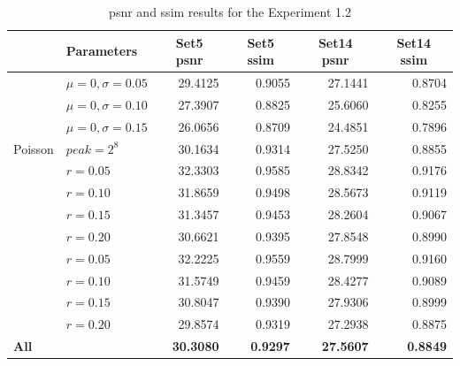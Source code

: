\begin{table}[]
	\centering
	\begin{tabular}{|l|l|r|r|r|r|}
		\hline
		\rowcolor[HTML]{EFEFEF} 
		\multicolumn{1}{|c|}{\cellcolor[HTML]{EFEFEF}\textbf{Noise}} & \textbf{Parameters} & \multicolumn{1}{c|}{\cellcolor[HTML]{EFEFEF}\textbf{Set5 \gls{psnr}}} & \multicolumn{1}{c|}{\cellcolor[HTML]{EFEFEF}\textbf{Set5 \gls{ssim}}} & \multicolumn{1}{c|}{\cellcolor[HTML]{EFEFEF}\textbf{Set14 \gls{psnr}}} & \multicolumn{1}{c|}{\cellcolor[HTML]{EFEFEF}\textbf{Set14 \gls{ssim}}} \\ \hline
		\rowcolor[HTML]{FFFFFF} 
		\cellcolor[HTML]{EFEFEF} & $\mu=0, \sigma=0.05$ & 29.4125 & 0.9055 & 27.1441 & 0.8704 \\
		\rowcolor[HTML]{EFEFEF} 
		\cellcolor[HTML]{EFEFEF} & $\mu=0, \sigma=0.10$ & 27.3907 & 0.8825 & 25.6060 & 0.8255 \\
		\rowcolor[HTML]{FFFFFF} 
		\multirow{-3}{*}{\cellcolor[HTML]{EFEFEF}Gaussian} & $\mu=0, \sigma=0.15$ & 26.0656 & 0.8709 & 24.4851 & 0.7896 \\
		\rowcolor[HTML]{EFEFEF} 
		Poisson & $peak=2^8$ & 30.1634 & 0.9314 & 27.5250 & 0.8855 \\
		\rowcolor[HTML]{FFFFFF} 
		\cellcolor[HTML]{EFEFEF} & $r=0.05$ & 32.3303 & 0.9585 & 28.8342 & 0.9176 \\
		\rowcolor[HTML]{EFEFEF} 
		\cellcolor[HTML]{EFEFEF} & $r=0.10$ & 31.8659 & 0.9498 & 28.5673 & 0.9119 \\
		\rowcolor[HTML]{FFFFFF} 
		\cellcolor[HTML]{EFEFEF} & $r=0.15$ & 31.3457 & 0.9453 & 28.2604 & 0.9067 \\
		\rowcolor[HTML]{EFEFEF} 
		\multirow{-4}{*}{\cellcolor[HTML]{EFEFEF}Salt-and-pepper} & $r=0.20$ & 30.6621 & 0.9395 & 27.8548 & 0.8990 \\
		\rowcolor[HTML]{FFFFFF} 
		\cellcolor[HTML]{EFEFEF} & $r=0.05$ & 32.2225 & 0.9559 & 28.7999 & 0.9160 \\
		\rowcolor[HTML]{EFEFEF} 
		\cellcolor[HTML]{EFEFEF} & $r=0.10$ & 31.5749 & 0.9459 & 28.4277 & 0.9089 \\
		\rowcolor[HTML]{FFFFFF} 
		\cellcolor[HTML]{EFEFEF} & $r=0.15$ & 30.8047 & 0.9390 & 27.9306 & 0.8999 \\
		\rowcolor[HTML]{EFEFEF} 
		\multirow{-4}{*}{\cellcolor[HTML]{EFEFEF}Uniform} & $r=0.20$ & 29.8574 & 0.9319 & 27.2938 & 0.8875 \\
		\rowcolor[HTML]{FFFFFF} 
		\textbf{All} &  & \textbf{30.3080} & \textbf{0.9297} & \textbf{27.5607} & \textbf{0.8849}\\\hline
	\end{tabular}
	\caption{\gls{psnr} and \gls{ssim} results for the Experiment 1.2}
	\label{tab:experiment12}
\end{table}

